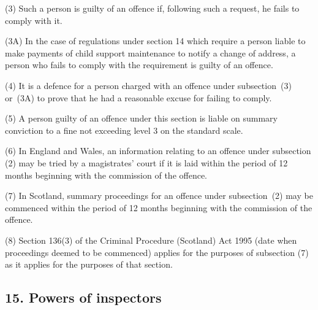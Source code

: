 \documentclass[12pt,a4paper]{article}
\begin{document}
(3) Such a person is guilty of an offence if, following such a request, he fails to comply with it.

(3A) In the case of regulations under section 14 which require a person liable to make payments of child support maintenance to notify a change of address, a person who fails to comply with the requirement is guilty of an offence.

(4) It is a defence for a person charged with an offence under subsection~(3)  
or~(3A)  %
to prove that he had a reasonable excuse for failing to comply.

(5) A person guilty of an offence under this section is liable on summary conviction to a fine not exceeding level 3 on the standard scale.

(6) In England and Wales, an information relating to an offence under subsection (2) may be tried by a magistrates' court if it is laid within the period of 12 months beginning with the commission of the offence.

(7) In Scotland, summary proceedings for an offence under subsection~(2) may be commenced within the period of 12 months beginning with the commission of the offence.

(8) Section 136(3) of the Criminal Procedure (Scotland) Act 1995 (date when proceedings deemed to be commenced) applies for the purposes of subsection (7) as it applies for the purposes of that section.


\subsection{15. Powers of inspectors}
\end{document}
